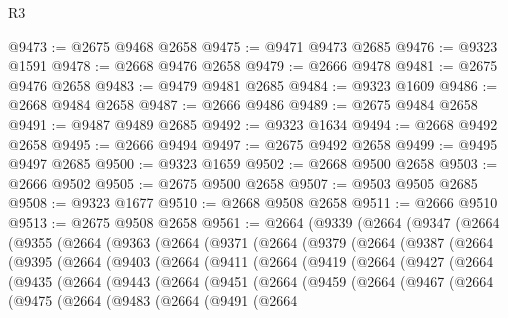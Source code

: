\begin{lexlean}{R3}
\begin{coremodule}
@9473 := @2675 @9468 @2658
@9475 := @9471 @9473 @2685
@9476 := @9323 @1591
@9478 := @2668 @9476 @2658
@9479 := @2666 @9478
@9481 := @2675 @9476 @2658
@9483 := @9479 @9481 @2685
@9484 := @9323 @1609
@9486 := @2668 @9484 @2658
@9487 := @2666 @9486
@9489 := @2675 @9484 @2658
@9491 := @9487 @9489 @2685
@9492 := @9323 @1634
@9494 := @2668 @9492 @2658
@9495 := @2666 @9494
@9497 := @2675 @9492 @2658
@9499 := @9495 @9497 @2685
@9500 := @9323 @1659
@9502 := @2668 @9500 @2658
@9503 := @2666 @9502
@9505 := @2675 @9500 @2658
@9507 := @9503 @9505 @2685
@9508 := @9323 @1677
@9510 := @2668 @9508 @2658
@9511 := @2666 @9510
@9513 := @2675 @9508 @2658
@9561 := @2664
    (@9339
      (@2664
        (@9347
          (@2664
            (@9355
              (@2664
                (@9363
                  (@2664
                    (@9371
                      (@2664
                        (@9379
                          (@2664
                            (@9387
                              (@2664
                                (@9395
                                  (@2664
                                    (@9403
                                      (@2664
                                        (@9411
                                          (@2664
                                            (@9419
                                              (@2664
                                                (@9427
                                                  (@2664
                                                    (@9435
                                                      (@2664
                                                        (@9443
                                                          (@2664
                                                            (@9451
                                                              (@2664
                                                                (@9459
                                                                  (@2664
                                                                    (@9467
                                                                      (@2664
                                                                        (@9475
                                                                          (@2664
                                                                            (@9483
                                                                              (@2664
                                                                                (@9491
                                                                                  (@2664

\end{coremodule}
\end{lexlean}
